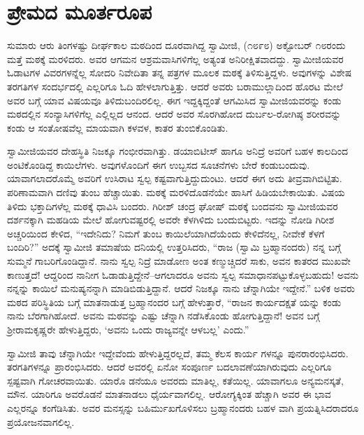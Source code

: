 
\chapter{ಪ್ರೇಮದ ಮೂರ್ತರೂಪ}

\noindent

ಸುಮಾರು ಆರು ತಿಂಗಳಷ್ಟು ದೀರ್ಘಕಾಲ ಮಠದಿಂದ ದೂರವಾಗಿದ್ದ ಸ್ವಾಮೀಜಿ, (೧೮೯೮) ಅಕ್ಟೋಬರ್ ೧೮ರಂದು ಮತ್ತೆ ಮಠಕ್ಕೆ ಮರಳಿದರು. ಅವರ ಆಗಮನ ಆಶ್ರಮವಾಸಿಗಳಿಗೆಲ್ಲ ಅತ್ಯಂತ ಅನಿರೀಕ್ಷಿತವಾದದ್ದು. ಸ್ವಾಮೀಜಿಯವರ ಓಡಾಟಗಳ ವಿವರಗಳನ್ನೆಲ್ಲ ಸೋದರಿ ನಿವೇದಿತಾ ತನ್ನ ಪತ್ರಗಳ ಮೂಲಕ ಮಠಕ್ಕೆ ತಿಳಿಸುತ್ತಿದ್ದಳು. ಅವುಗಳನ್ನು ವಿಶೇಷ ತರಗತಿಗಳ ಸಂದರ್ಭದಲ್ಲಿ ಎಲ್ಲರಿಗೂ ಓದಿ ಹೇಳಲಾಗುತ್ತಿತ್ತು. ಆದರೆ ಅವರು ಬರಾಮುಲ್ಲಾದಿಂದ ಹೊರಟ ಮೇಲೆ ಅವರ ಬಗ್ಗೆ ಯಾವ ವಿಷಯವೂ ತಿಳಿದುಬಂದಿರಲಿಲ್ಲ. ಈಗ ಇದ್ದಕ್ಕಿದ್ದಂತೆ ಆಗಮಿಸಿದ ಸ್ವಾಮೀಜಿಯವರನ್ನು ಕಂಡು ಮಠದಲ್ಲಿನ ಸಂನ್ಯಾಸಿಗಳಿಗೆಲ್ಲ ಎಲ್ಲಿಲ್ಲದ ಆನಂದ. ಆದರೆ ಅವರ ಸೊರಗಿಹೋದ ದುರ್ಬಲ-ರೋಗಿಷ್ಠ ಶರೀರವನ್ನು ಕಂಡು ಆ ಸಂತೋಷವೆಲ್ಲ ಮಾಯವಾಗಿ ಕಳವಳ, ಕಾತರ ತುಂಬಿಕೊಂಡಿತು.

ಸ್ವಾಮೀಜಿಯವರ ದೇಹಸ್ಥಿತಿ ನಿಜಕ್ಕೂ ಗಂಭೀರವಾಗಿತ್ತು. ಡಯಾಬಿಟೀಸ್ ಹಾಗೂ ಅನಿದ್ರೆ ಅವರಿಗೆ ಬಹಳ ಕಾಲದಿಂದ ಅಂಟಿಕೊಂಡಿದ್ದ ಕಾಯಿಲೆಗಳು. ಅವುಗಳೊಂದಿಗೆ ಈಗ ಉಬ್ಬಸದ ಸೂಚನೆಗಳು ಬೇರೆ ಕಂಡುಬಂದುವು. ಯಾವಾಗಲಾದರೊಮ್ಮೆ ಅವರಿಗೆ ಉಸಿರಾಟ ಸ್ವಲ್ಪ ಕಷ್ಟವಾಗುತ್ತಿದ್ದುದುಂಟು. ಆದರೆ ಈಗ ಅದು ತೀವ್ರವಾಗಿಬಿಟ್ಟಿತು. ಪರಿಣಾಮವಾಗಿ ದಣಿವು ತುಂಬ ಹೆಚ್ಚಾಯಿತು. ಮಠಕ್ಕೆ ಮರಳಿದೊಡನೆಯೇ ಹಾಸಿಗೆ ಹಿಡಿಯಬೇಕಾಯಿತು. ವಿಷಯ ತಿಳಿದು ಭಕ್ತಾದಿಗಳೆಲ್ಲ ಮಠಕ್ಕೆ ಧಾವಿಸಿ ಬಂದರು. ಗಿರೀಶ್ ಚಂದ್ರ ಘೋಷ್ ಮಠಕ್ಕೆ ಬಂದವನು ಸ್ವಾಮೀಜಿಯವರ ದರ್ಶನಕ್ಕಾಗಿ ಮಹಡಿಯ ಮೇಲೆ ಹೋಗುವಷ್ಟರಲ್ಲಿ ಅವರೇ ಕೆಳಗಿಳಿದು ಬಂದುಬಿಟ್ಟರು. ಇದನ್ನು ನೋಡಿ ಗಿರೀಶ ಅಚ್ಚರಿಯಿಂದ ಕೇಳಿದ, “ಇದೇನಿದು? ನಿಮಗೆ ತುಂಬ ಕಾಯಿಲೆಯಾಗಿದೆಯೆಂದು ಕೇಳಿದೆನಲ್ಲ, ನೀವೇಕೆ ಕೆಳಗೆ ಬಂದಿರಿ?” ಅದಕ್ಕೆ ಸ್ವಾಮೀಜಿ ತಮಾಷೆಯ ದನಿಯಲ್ಲಿ ಉತ್ತರಿಸಿದರು, “ರಾಜ (ಸ್ವಾಮಿ ಬ್ರಹ್ಮಾನಂದರು) ನನ್ನ ಬಗ್ಗೆ ಸುಮ್ಮನೆ ಗಾಬರಿಗೊಂಡಿದ್ದಾನೆ. ನಾನು ಸ್ವಲ್ಪ ನಿದ್ರೆ ಮಾಡೋಣ ಅಂತ ಕಣ್ಮುಚ್ಚಿದರೆ ಸಾಕು, ಅವನ ಕಾತರದ ಮುಖವೇ ಕಾಣುತ್ತದೆ! ಆದ್ದರಿಂದ ನಾನೀಗ ಓಡಾಡುತ್ತಿದ್ದೇನೆ–ಆಗಲಾದರೂ ಅವನು ಸ್ವಲ್ಪ ಸಮಾಧಾನಪಟ್ಟುಕೊಳ್ಳಬಹುದು! ಅವನು ನನ್ನನ್ನು ಕಾಯಿಲೆ ಮನುಷ್ಯನನ್ನಾಗಿ ಮಾಡಿಬಿಡುತ್ತಿದ್ದಾನೆ. ಆದರೆ ನಿಜಕ್ಕೂ ನಾನು ಚೆನ್ನಾಗಿಯೇ ಇದ್ದೇನೆ.” ಬಳಿಕ ಅವರು ಮಠದ ಪರಿಸ್ಥಿತಿಯ ಬಗ್ಗೆ ಮಾತನಾಡುತ್ತ ಬ್ರಹ್ಮಾನಂದರ ಬಗ್ಗೆ ಹೇಳುತ್ತಾರೆ, “ರಾಜನ ಕಾರ್ಯದಕ್ಷತೆ ಯನ್ನು ಕಂಡು ನಾನು ಬೆರಗಾಗಿಹೋದೆ. ಅವನು ಮಠವನ್ನು ಎಷ್ಟು ಚೆನ್ನಾಗಿ ನಡೆಸಿಕೊಂಡು ಹೋಗುತ್ತಿದ್ದಾನೆ! ಅವನ ಬಗ್ಗೆ ಶ್ರೀರಾಮಕೃಷ್ಣರೇ ಹೇಳುತ್ತಿದ್ದರು, ‘ಅವನು ಒಂದು ರಾಜ್ಯವನ್ನೇ ಆಳಬಲ್ಲ’ ಎಂದು.”

ಸ್ವಾಮೀಜಿ ತಾವು ಚೆನ್ನಾಗಿಯೇ ಇದ್ದೇವೆಂದು ಹೇಳುತ್ತಿದ್ದರಲ್ಲದೆ, ತಮ್ಮ ಕೆಲಸ ಕಾರ್ಯ ಗಳನ್ನೂ ಪುನರಾರಂಭಿಸಿದರು. ತರಗತಿಗಳನ್ನೂ ಪ್ರಾರಂಭಿಸಿದರು. ಆದರೆ ಅವರಲ್ಲಿ ಏನೋ ಸಂಪೂರ್ಣ ಬದಲಾವಣೆಯಾಗಿರುವುದು ಎಲ್ಲರಿಗೂ ಸ್ಪಷ್ಟವಾಗಿ ಗೋಚರವಾಯಿತು. ಯಾರೊ ಡನೆಯೂ ಅವರದು ಮಾತಿಲ್ಲ, ಕತೆಯಿಲ್ಲ. ಯಾವಾಗಲೂ ಅನ್ಯಮನಸ್ಕತೆ, ಮೌನ. ಯಾರಿಗೂ ಅವರೊಡನೆ ಮಾತನಾಡಲು ಧೈರ್ಯವಾಗಲಿಲ್ಲ. ಆರೋಗ್ಯಕ್ಕಿಂತ ಹೆಚ್ಚಾಗಿ ಅವರ ಈ ಭಾವ ಎಲ್ಲರನ್ನೂ ಕಂಗೆಡಿಸಿತು. ಅವರ ಮನಸ್ಸನ್ನು ಬಹಿರ್ಮುಖಗೊಳಿಸಲು ಬ್ರಹ್ಮಾನಂದರು ಬಹಳ ವಾಗಿ ಪ್ರಯತ್ನಿಸಿದರಾದರೂ ಪ್ರಯೋಜನವಾಗಲಿಲ್ಲ.

